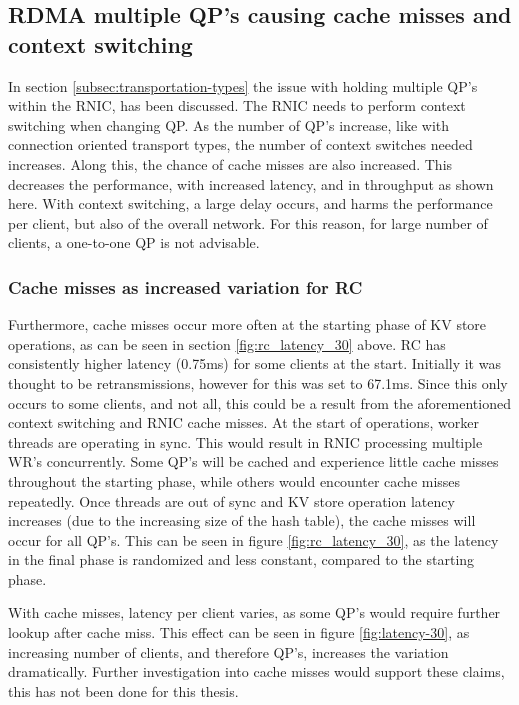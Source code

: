 \subsection{RDMA multiple QP's causing cache misses and context switching}
In section \ref{subsec:transportation-types} the issue with holding multiple QP's within the RNIC, has been discussed.
The RNIC needs to perform context switching when changing QP.
As the number of QP's increase, like with connection oriented transport types, the number of context switches needed increases.
Along this, the chance of cache misses are also increased.
This decreases the performance, with increased latency, and in throughput as shown here.
With context switching, a large delay occurs, and harms the performance per client, but also of the overall network.
For this reason, for large number of clients, a one-to-one QP is not advisable.

\subsubsection{Cache misses as increased variation for RC}
Furthermore, cache misses occur more often at the starting phase of KV store operations, as can be seen in section \ref{fig:rc_latency_30} above.
RC has consistently higher latency (0.75ms) for some clients at the start.
Initially it was thought to be retransmissions, however for this was set to 67.1ms.
Since this only occurs to some clients, and not all, this could be a result from the aforementioned context switching and RNIC cache misses.
At the start of operations, worker threads are operating in sync.
This would result in RNIC processing multiple WR's concurrently.
Some QP's will be cached and experience little cache misses throughout the starting phase, while others would encounter cache misses repeatedly.
Once threads are out of sync and KV store operation latency increases (due to the increasing size of the hash table), the cache misses will occur for all QP's.
This can be seen in figure \ref{fig:rc_latency_30}, as the latency in the final phase is randomized and less constant, compared to the starting phase.

With cache misses, latency per client varies, as some QP's would require further lookup after cache miss.
This effect can be seen in figure \ref{fig:latency-30}, as increasing number of clients, and therefore QP's, increases the variation dramatically.
Further investigation into cache misses would support these claims, this has not been done for this thesis.

